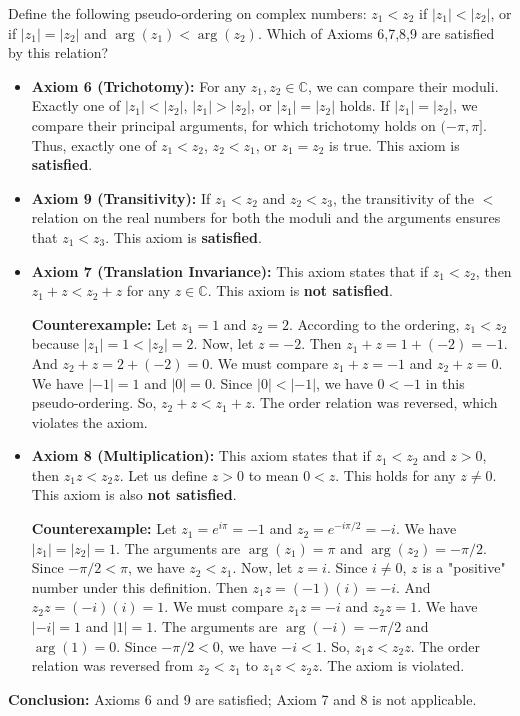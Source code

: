 \begin{problembox}
Define the following pseudo-ordering on complex numbers: $z_1 < z_2$ if $|z_1| < |z_2|$, or if $|z_1|=|z_2|$ and $\arg(z_1) < \arg(z_2)$. Which of Axioms 6,7,8,9 are satisfied by this relation?
\end{problembox}

\begin{itemize}
    \item \textbf{Axiom 6 (Trichotomy):} For any $z_1, z_2 \in \mathbb{C}$, we can compare their moduli. Exactly one of $|z_1| < |z_2|$, $|z_1| > |z_2|$, or $|z_1| = |z_2|$ holds. If $|z_1| = |z_2|$, we compare their principal arguments, for which trichotomy holds on $(-\pi, \pi]$. Thus, exactly one of $z_1 < z_2$, $z_2 < z_1$, or $z_1 = z_2$ is true. This axiom is \textbf{satisfied}.

    \item \textbf{Axiom 9 (Transitivity):} If $z_1 < z_2$ and $z_2 < z_3$, the transitivity of the $<$ relation on the real numbers for both the moduli and the arguments ensures that $z_1 < z_3$. This axiom is \textbf{satisfied}.

    \item \textbf{Axiom 7 (Translation Invariance):} This axiom states that if $z_1 < z_2$, then $z_1 + z < z_2 + z$ for any $z \in \mathbb{C}$. This axiom is \textbf{not satisfied}.
    
    \textbf{Counterexample:} Let $z_1 = 1$ and $z_2 = 2$. According to the ordering, $z_1 < z_2$ because $|z_1|=1 < |z_2|=2$.
    Now, let $z = -2$.
    Then $z_1 + z = 1 + (-2) = -1$.
    And $z_2 + z = 2 + (-2) = 0$.
    We must compare $z_1+z = -1$ and $z_2+z=0$.
    We have $|-1|=1$ and $|0|=0$. Since $|0| < |-1|$, we have $0 < -1$ in this pseudo-ordering.
    So, $z_2 + z < z_1 + z$. The order relation was reversed, which violates the axiom.

    \item \textbf{Axiom 8 (Multiplication):} This axiom states that if $z_1 < z_2$ and $z > 0$, then $z_1 z < z_2 z$. Let us define $z>0$ to mean $0<z$. This holds for any $z \neq 0$. This axiom is also \textbf{not satisfied}.
    
    \textbf{Counterexample:} Let $z_1 = e^{i\pi} = -1$ and $z_2 = e^{-i\pi/2} = -i$.
    We have $|z_1| = |z_2| = 1$. The arguments are $\arg(z_1) = \pi$ and $\arg(z_2) = -\pi/2$. Since $-\pi/2 < \pi$, we have $z_2 < z_1$.
    Now, let $z = i$. Since $i \neq 0$, $z$ is a "positive" number under this definition.
    Then $z_1 z = (-1)(i) = -i$.
    And $z_2 z = (-i)(i) = 1$.
    We must compare $z_1 z = -i$ and $z_2 z = 1$.
    We have $|-i|=1$ and $|1|=1$. The arguments are $\arg(-i) = -\pi/2$ and $\arg(1) = 0$. Since $-\pi/2 < 0$, we have $-i < 1$.
    So, $z_1 z < z_2 z$. The order relation was reversed from $z_2 < z_1$ to $z_1 z < z_2 z$. The axiom is violated.
\end{itemize}
\textbf{Conclusion:} Axioms 6 and 9 are satisfied; Axiom 7 and 8 is not applicable.

